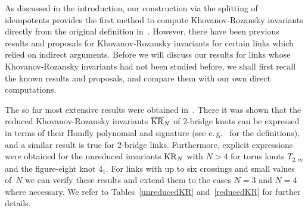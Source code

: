 \documentclass{compositio}
\newtheorem{proposition}[theorem]{Proposition}
\theoremstyle{definition}
\numberwithin{equation}{section}
\begin{document}
As discussed in the introduction, our construction via the splitting of idempotents provides the first method to compute Khovanov-Rozansky invariants directly from the original definition in~\cite{kr0401268}. However, there have been previous results and proposals for Khovanov-Rozansky invariants for certain links which relied on indirect arguments. Before we will discuss our results for links whose Khovanov-Rozansky invariants had not been studied before, we shall first recall the known results and proposals, and compare them with our own direct computations. 

The so far most extensive results were obtained in~\cite{r0508510, r0607544}. There it was shown that the reduced Khovanov-Rozansky invariants $\overline{\operatorname{KR}}_{N}$ of 2-bridge knots can be expressed in terms of their Homfly polynomial and signature (see e.\,g.~\cite{kawauchibook} for the definitions), and a similar result is true for 2-bridge links. Furthermore, explicit expressions were obtained for the unreduced invariants $\operatorname{KR}_{N}$ with $N>4$ for torus knots $T_{2,m}$ and the figure-eight knot $4_{1}$. For links with up to six crossings and small values of~$N$ we can verify these results and extend them to the cases $N=3$ and $N=4$ where necessary. We refer to Tables~\ref{unreducedKR} and~\ref{reducedKR} for further details. 

%
\end{document}
